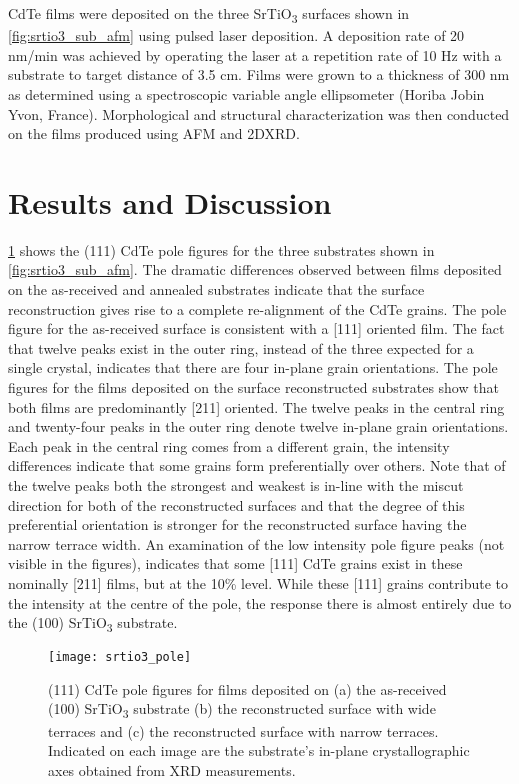 CdTe films were deposited on the three SrTiO\textsubscript{3} surfaces shown
in \cref{fig:srtio3_sub_afm} using pulsed laser deposition. A deposition rate of 20 nm/min was achieved by
operating the laser at a repetition rate of 10 Hz with a substrate to
target distance of 3.5 cm. Films were grown to
a thickness of 300 nm as determined using a spectroscopic variable
angle ellipsometer (Horiba Jobin Yvon, France). Morphological and
structural characterization was then conducted on the films
produced using AFM and 2DXRD.
\section{Results and Discussion}
\cref{fig:srtio3_pole} shows the (111) CdTe pole figures for the three substrates
shown in \cref{fig:srtio3_sub_afm}. The dramatic differences observed between films
deposited on the as-received and annealed substrates indicate that
the surface reconstruction gives rise to a complete re-alignment of
the CdTe grains. The pole figure for the as-received surface is
consistent with a [111] oriented film. The fact that twelve peaks
exist in the outer ring, instead of the three expected for a single
crystal, indicates that there are four in-plane grain orientations.
The pole figures for the films deposited on the surface reconstructed substrates show that both films are predominantly [211]
oriented. The twelve peaks in the central ring and twenty-four
peaks in the outer ring denote twelve in-plane grain orientations. Each peak in the central ring comes from a different grain, the intensity differences indicate that some grains form
preferentially over others. Note that of the twelve peaks both
the strongest and weakest is in-line with the miscut direction for
both of the reconstructed surfaces and that the degree of this
preferential orientation is stronger for the reconstructed surface
having the narrow terrace width. An examination of the low
intensity pole figure peaks (not visible in the figures), indicates that
some [111] CdTe grains exist in these nominally [211] films, but
at the 10\% level. While these [111] grains contribute to
the intensity at the centre of the pole, the response there is almost
entirely due to the (100) SrTiO\textsubscript{3} substrate.
\begin{figure}
    \centering
    \texttt{[image: srtio3\_pole]}
    \caption{\label{fig:srtio3_pole}(111) CdTe pole figures for films deposited on (a) the as-received (100) SrTiO\textsubscript{3} substrate (b) the reconstructed surface with wide terraces and (c) the reconstructed surface with narrow terraces. Indicated on each image are the substrate’s in-plane crystallographic axes obtained from XRD measurements.}
\end{figure}
